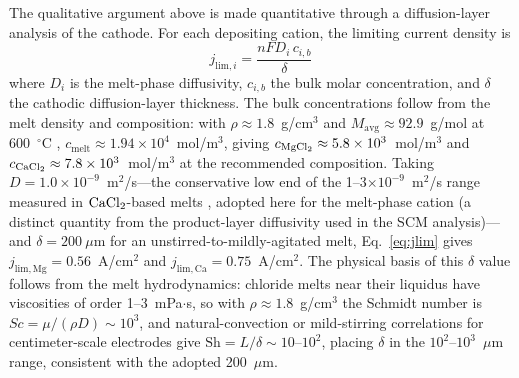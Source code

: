 \documentclass[pdflatex,sn-basic,Numbered]{sn-jnl}
\begin{document}
The qualitative argument above is made quantitative through a diffusion-layer analysis of the cathode. For each depositing cation, the limiting current density is
\begin{equation}
\label{eq:jlim}
j_{\mathrm{lim},i} = \frac{n F D_i\, c_{i,b}}{\delta}
\end{equation}
where $D_i$ is the melt-phase diffusivity, $c_{i,b}$ the bulk molar concentration, and $\delta$ the cathodic diffusion-layer thickness. The bulk concentrations follow from the melt density and composition: with $\rho \approx 1.8$~g/cm$^3$ and $M_{\mathrm{avg}} \approx 92.9$~g/mol at 600~$^{\circ}$C \cite{sato1999}, $c_{\mathrm{melt}} \approx 1.94\times10^{4}$~mol/m$^3$, giving $c_{\ce{MgCl2}} \approx 5.8\times10^{3}$~mol/m$^3$ and $c_{\ce{CaCl2}} \approx 7.8\times10^{3}$~mol/m$^3$ at the recommended composition. Taking $D = 1.0\times10^{-9}$~m$^2$/s---the conservative low end of the 1--3$\times10^{-9}$~m$^2$/s range measured in $\ce{CaCl2}$-based melts \cite{fray2000,yan2007}, adopted here for the melt-phase cation (a distinct quantity from the product-layer diffusivity used in the SCM analysis)---and $\delta = 200~\mu$m for an unstirred-to-mildly-agitated melt, Eq.~\ref{eq:jlim} gives $j_{\mathrm{lim,Mg}} = 0.56$~A/cm$^2$ and $j_{\mathrm{lim,Ca}} = 0.75$~A/cm$^2$. The physical basis of this $\delta$ value follows from the melt hydrodynamics: chloride melts near their liquidus have viscosities of order 1--3~mPa$\cdot$s, so with $\rho \approx 1.8$~g/cm$^3$ the Schmidt number is $Sc = \mu/(\rho D) \sim 10^{3}$, and natural-convection or mild-stirring correlations for centimeter-scale electrodes give $\mathrm{Sh} = L/\delta \sim 10$--$10^{2}$, placing $\delta$ in the $10^{2}$--$10^{3}$~$\mu$m range, consistent with the adopted 200~$\mu$m.
\end{document}
